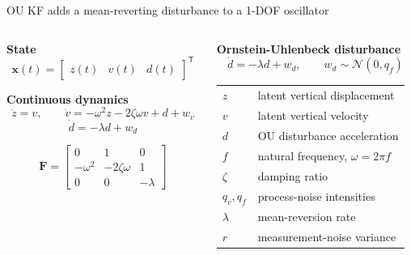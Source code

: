 \documentclass[aspectratio=169,11pt]{beamer}
\begin{document}
\begin{frame}{OU KF adds a mean-reverting disturbance to a 1-DOF oscillator}
  \begin{columns}[T,onlytextwidth]
    \begin{column}{0.51\textwidth}
      \small
      \textbf{State}
      \[
        \mathbf{x}(t)=
        \begin{bmatrix}z(t)&v(t)&d(t)\end{bmatrix}^{\mathsf T}
      \]

      \textbf{Continuous dynamics}
      \[
        \dot z=v,\qquad
        \dot v=-\omega^2z-2\zeta\omega v+d+w_v
      \]
      \[
        \dot d=-\lambda d+w_d
      \]

      \[
      \mathbf F=
      \begin{bmatrix}
        0&1&0\\
        -\omega^2&-2\zeta\omega&1\\
        0&0&-\lambda
      \end{bmatrix}
      \]
    \end{column}
    \begin{column}{0.45\textwidth}
      \small
      \textbf{Ornstein-Uhlenbeck disturbance}
      \[
        \dot d=-\lambda d+w_d,\qquad
        w_d\sim\mathcal N(0,q_f)
      \]

      \renewcommand{\arraystretch}{1.12}
      \begin{tabularx}{\textwidth}{@{}p{1.1cm}Y@{}}
        $z$ & latent vertical displacement\\
        $v$ & latent vertical velocity\\
        $d$ & OU disturbance acceleration\\
        $f$ & natural frequency, $\omega=2\pi f$\\
        $\zeta$ & damping ratio\\
        $q_v,q_f$ & process-noise intensities\\
        $\lambda$ & mean-reversion rate\\
        $r$ & measurement-noise variance\\
      \end{tabularx}
    \end{column}
  \end{columns}
\end{frame}
\end{document}
